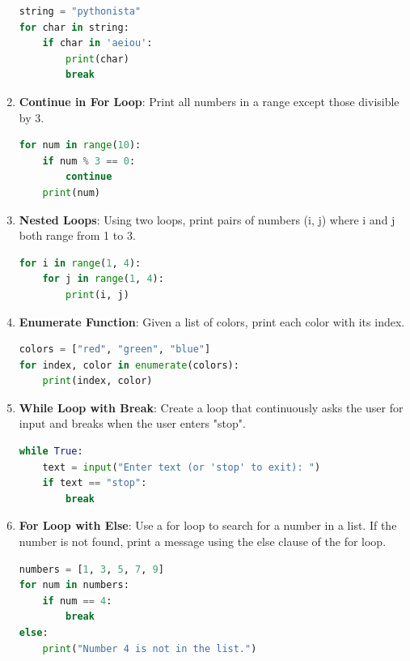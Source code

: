 \documentclass[12pt]{book}
\begin{document}
\begin{enumerate}
    \begin{lstlisting}[language=Python]
string = "pythonista"
for char in string:
    if char in 'aeiou':
        print(char)
        break
    \end{lstlisting}

    \item \textbf{Continue in For Loop}: Print all numbers in a range except those divisible by 3. \\

    \begin{lstlisting}[language=Python]
for num in range(10):
    if num % 3 == 0:
        continue
    print(num)
    \end{lstlisting}

    \item \textbf{Nested Loops}: Using two loops, print pairs of numbers (i, j) where i and j both range from 1 to 3. \\

    \begin{lstlisting}[language=Python]
for i in range(1, 4):
    for j in range(1, 4):
        print(i, j)
    \end{lstlisting}

    \item \textbf{Enumerate Function}: Given a list of colors, print each color with its index. \\

    \begin{lstlisting}[language=Python]
colors = ["red", "green", "blue"]
for index, color in enumerate(colors):
    print(index, color)
    \end{lstlisting}

    \item \textbf{While Loop with Break}: Create a loop that continuously asks the user for input and breaks when the user enters "stop". \\

    \begin{lstlisting}[language=Python]
while True:
    text = input("Enter text (or 'stop' to exit): ")
    if text == "stop":
        break
    \end{lstlisting}

    \item \textbf{For Loop with Else}: Use a for loop to search for a number in a list. If the number is not found, print a message using the else clause of the for loop. \\

\begin{lstlisting}[language=Python]
numbers = [1, 3, 5, 7, 9]
for num in numbers:
    if num == 4:
        break
else:
    print("Number 4 is not in the list.")
\end{lstlisting}


\end{enumerate}
\end{document}
